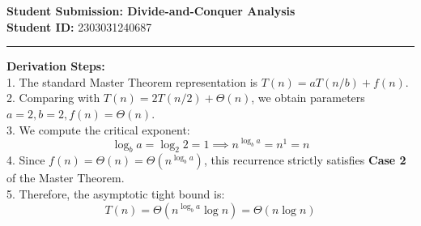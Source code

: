 \documentclass[11pt,a4paper]{article}
\begin{document}
\begin{center}
    {\large\bfseries Student Submission: Divide-and-Conquer Analysis}\\[0.1cm]
    \textbf{Student ID:} 2303031240687
\end{center}
\hrule
\vspace{0.5cm}

\noindent\textbf{Derivation Steps:}\\
1. The standard Master Theorem representation is $T(n) = aT(n/b) + f(n)$.\\
2. Comparing with $T(n) = 2T(n/2) + \Theta(n)$, we obtain parameters $a = 2, b = 2, f(n) = \Theta(n)$.\\
3. We compute the critical exponent:
\[
\log_b a = \log_2 2 = 1 \implies n^{\log_b a} = n^1 = n
\]
4. Since $f(n) = \Theta(n) = \Theta(n^{\log_b a})$, this recurrence strictly satisfies \textbf{Case 2} of the Master Theorem.\\
5. Therefore, the asymptotic tight bound is:
\[
T(n) = \Theta(n^{\log_b a} \log n) = \Theta(n \log n)
\]
\end{document}
